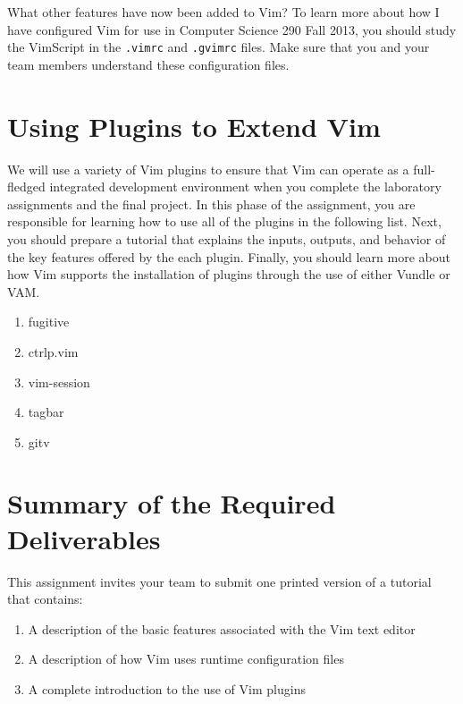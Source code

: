 What other features have now been added to Vim?  To learn more about how I have configured Vim for use in Computer
Science 290 Fall 2013, you should study the VimScript in the {\tt .vimrc} and {\tt .gvimrc} files.  Make sure that you
and your team members understand these configuration files.

\section*{Using Plugins to Extend Vim}

We will use a variety of Vim plugins to ensure that Vim can operate as a full-fledged integrated development environment
when you complete the laboratory assignments and the final project.  In this phase of the assignment, you are
responsible for learning how to use all of the plugins in the following list.  Next, you should prepare a tutorial that 
explains the inputs, outputs, and behavior of the key features offered by the each plugin.  Finally, you should learn
more about how Vim supports the installation of plugins through the use of either Vundle or VAM.

\begin{enumerate}

	\item fugitive

	\item ctrlp.vim

	\item vim-session

	\item tagbar

	\item gitv

\end{enumerate}

\section*{Summary of the Required Deliverables}

This assignment invites your team to submit one printed version of a tutorial that contains:

\begin{enumerate}
	
	\item A description of the basic features associated with the Vim text editor

	\item A description of how Vim uses runtime configuration files

	\item A complete introduction to the use of Vim plugins 

\end{enumerate}

